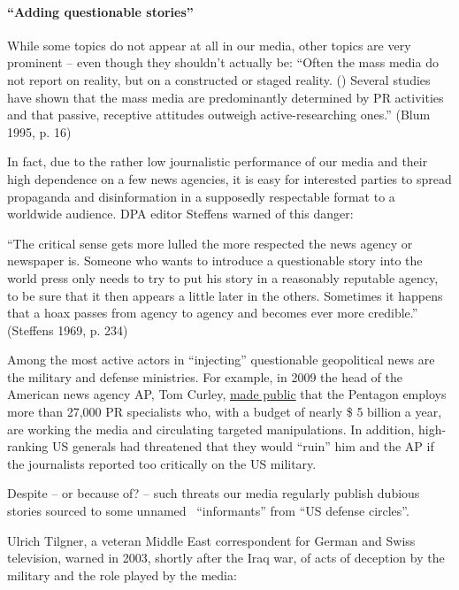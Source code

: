 \hypertarget{adding-questionable-stories}{%
\paragraph{``Adding questionable
stories''}\label{adding-questionable-stories}}

While some topics do not appear at all in our media, other topics are
very prominent -- even though they shouldn't actually be: ``Often the
mass media do not report on reality, but on a constructed or staged
reality. () Several studies have shown that the mass media are
predominantly determined by PR activities and that passive, receptive
attitudes outweigh active-researching ones.'' (Blum 1995, p. 16)

In fact, due to the rather low journalistic performance of our media and
their high dependence on a few news agencies, it is easy for interested
parties to spread propaganda and disinformation in a supposedly
respectable format to a worldwide audience. DPA editor Steffens warned
of this danger:

``The critical sense gets more lulled the more respected the news agency
or newspaper is. Someone who wants to introduce a questionable story
into the world press only needs to try to put his story in a reasonably
reputable agency, to be sure that it then appears a little later in the
others. Sometimes it happens that a hoax passes from agency to agency
and becomes ever more credible.'' (Steffens 1969, p. 234)

Among the most active actors in ``injecting'' questionable geopolitical
news are the military and defense ministries. For example, in 2009 the
head of the American news agency AP, Tom Curley,
\href{https://harpers.org/blog/2009/02/pentagon-targeted-and-mistreated-journalists-ap-head-charges/}{made
public} that the Pentagon employs more than 27,000 PR specialists who,
with a budget of nearly \$ 5 billion a year, are working the media and
circulating targeted manipulations. In addition, high-ranking US
generals had threatened that they would ``ruin'' him and the AP if the
journalists reported too critically on the US military.

Despite -- or because of? -- such threats our media regularly publish
dubious stories sourced to some unnamed~ ``informants'' from ``US
defense circles''.

Ulrich Tilgner, a veteran Middle East correspondent for German and Swiss
television, warned in 2003, shortly after the Iraq war, of acts of
deception by the military and the role played by the media:

